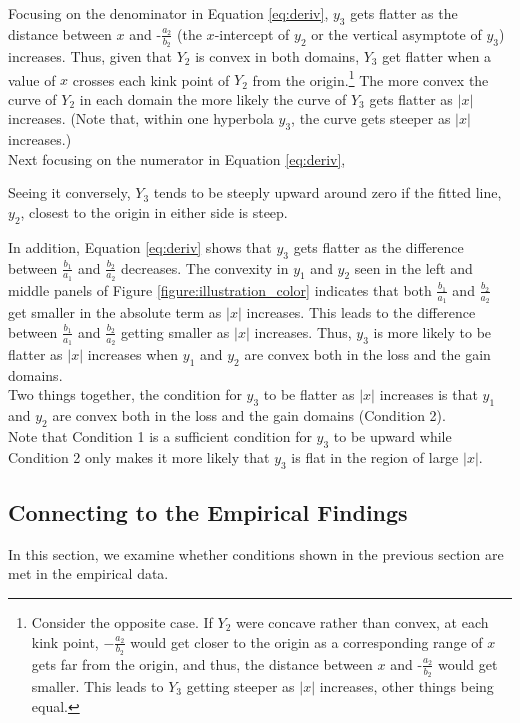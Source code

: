 \documentclass[11pt, a4paper]{article}
\begin{document}
\noindent
Focusing on the denominator in Equation \ref{eq:deriv}, $y_3$ gets flatter as the distance between $x$ and $\mbox{-}\frac{a_2}{b_2}$ (the $x$-intercept of $y_2$ or the vertical asymptote of $y_3$) increases. Thus, given that $Y_2$ is convex in both domains, $Y_3$ get flatter when a value of $x$ crosses each kink point of $Y_2$ from the origin.\footnote{Consider the opposite case. If $Y_2$ were concave rather than convex, at each kink point, $-\frac{a_2}{b_2}$ would get closer to the origin as a corresponding range of $x$ gets far from the origin, and thus, the distance between $x$ and $\mbox{-}\frac{a_2}{b_2}$ would get smaller. This leads to $Y_3$ getting steeper as $|x|$ increases, other things being equal.} 
The more convex the curve of $Y_2$ in each domain the more likely the curve of $Y_3$ gets flatter as $|x|$ increases. (Note that, within one hyperbola $y_3$, the curve gets steeper as $|x|$ increases.)\\ 

Next focusing on the numerator in Equation \ref{eq:deriv},

Seeing it conversely, $Y_3$ tends to be steeply upward around zero if the fitted line, $y_2$, closest to the origin in either side is steep.

\noindent
In addition, Equation \ref{eq:deriv} shows that $y_3$ gets flatter as the difference between $\frac{b_1}{a_1}$ and $\frac{b_2}{a_2}$ decreases.  The convexity in $y_1$ and $y_2$ seen in the left and middle panels of Figure \ref{figure:illustration_color} indicates that both $\frac{b_1}{a_1}$ and $\frac{b_2}{a_2}$ get smaller in the absolute term as $|x|$ increases. This leads to the difference between $\frac{b_1}{a_1}$ and $\frac{b_2}{a_2}$ getting smaller as $|x|$ increases. Thus, $y_3$ is more likely to be flatter as $|x|$ increases when $y_1$ and $y_2$ are convex both in the loss and the gain domains.\\

\noindent
Two things together, the condition for $y_3$ to be flatter as $|x|$ increases is that $y_1$ and $y_2$ are convex both in the loss and the gain domains (Condition 2). \\

\noindent
Note that Condition 1 is a sufficient condition for $y_3$ to be upward while Condition 2 only makes it more likely that $y_3$ is flat in the region of large $|x|$.\\

\subsection{Connecting to the Empirical Findings}
\label{section:emp_cond}
In this section, we examine whether conditions shown in the previous section are met in the empirical data.
\end{document}
